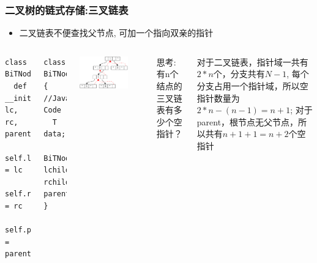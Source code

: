 \begin{frame}[fragile]
  \frametitle{二叉树的链式存储:三叉链表}
  \begin{itemize}
  \item 二叉链表不便查找父节点, 可加一个指向双亲的指针
  \end{itemize}

  \begin{columns}[T]
    \begin{verbatim}
class BiTNode:
  def __init__(self, lc, rc, parent):
    self.lc = lc
    self.rc = rc
    self.parent = parent
    \end{verbatim}

    \begin{verbatim}
class BiTNode<T> { //Java Code
  T data;
  BiTNode lchild, rchild, parent;
}
    \end{verbatim}

    \includegraphics[width=0.75\textwidth]{dot/tree-store-trilink.pdf}
    
    \scriptsize 思考: 有n个结点的三叉链表有多少个空指针？

    \pause
    
    对于二叉链表，指针域一共有$2*n$个，分支共有$N-1$,  每个分支占用一个指针域，所以空指针数量为$2*n - (n - 1) = n+1 $;  对于parent，根节点无父节点，所以共有$n+1+1=n+2$个空指针
  \end{columns}
\end{frame}


\begin{frame}
  ~  
\end{frame}


